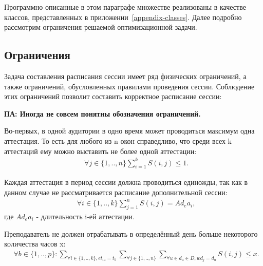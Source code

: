 Программно описанные в этом параграфе множестве реализованы в качестве классов, представленных в приложении~\ref{appendix-classes}. Далее подробно рассмотрим ограничения решаемой оптимизационной задачи.

\subsection{Ограничения}\label{subsec:constraints}
Задача составления расписания сессии имеет ряд физических ограничений, а также ограничений, обусловленных правилами проведения сессии. Соблюдение этих ограничений позволит составить корректное расписание сессии:

\textbf{ПА: Иногда не совсем понятны обозначения ограничений.}

Во-первых, в одной аудитории в одно время может проводиться максимум одна аттестация. То есть для любого из n окон справедливо, что среди всех k аттестаций ему можно выставить не более одной аттестации:
\begin{align}
	& \forall  j \in \{1,..,n\} \sum_{i=1}^kS(i,j) \leq 1.
\end{align}


Каждая аттестация в период сессии должна проводиться единожды, так как в данном случае не рассматривается расписание дополнительной сессии:
\begin{align}
	& \forall  i \in \{1,..,k\} \sum_{j=1}^nS(i,j) = Ad_ea_i,
\end{align}
где $Ad_ea_i$ - длительность i-ей аттестации.

Преподаватель не должен отрабатывать в определённый день больше некоторого количества часов x:
\begin{align}
	& \forall b \in \{1,..,p\} : \sum_{\forall i \in \{1,..,k\}, et_{ia}=t_b}\sum_{\forall j \in \{1,..,n\}}\sum_{ \forall u \in d_u \in D, wd_j = d_u }S(i,j) \leq x.
\end{align}


